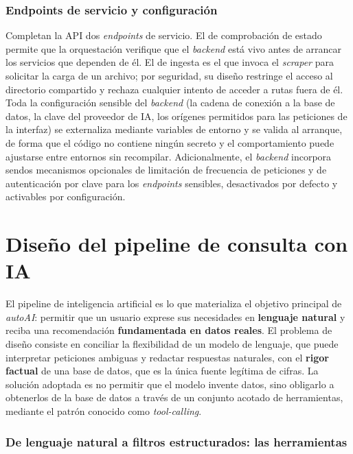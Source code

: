 \subsubsection*{Endpoints de servicio y configuración}

Completan la API dos \emph{endpoints} de servicio. El de comprobación de estado
permite que la orquestación verifique que el \emph{backend} está vivo antes de
arrancar los servicios que dependen de él. El de ingesta es el que invoca el
\emph{scraper} para solicitar la carga de un archivo; por seguridad, su diseño
restringe el acceso al directorio compartido y rechaza cualquier intento de
acceder a rutas fuera de él. Toda la configuración sensible del \emph{backend}
(la cadena de conexión a la base de datos, la clave del proveedor de IA, los
orígenes permitidos para las peticiones de la interfaz) se externaliza mediante
variables de entorno y se valida al arranque, de forma que el código no contiene
ningún secreto y el comportamiento puede ajustarse entre entornos sin
recompilar. Adicionalmente, el \emph{backend} incorpora sendos mecanismos
opcionales de limitación de frecuencia de peticiones y de autenticación por
clave para los \emph{endpoints} sensibles, desactivados por defecto y activables
por configuración.

\section{Diseño del pipeline de consulta con IA}
\label{sec:diseno-pipeline-ia}

El pipeline de inteligencia artificial es lo que materializa el objetivo
principal de \emph{autoAI}: permitir que un usuario exprese sus necesidades en
\textbf{lenguaje natural} y reciba una recomendación \textbf{fundamentada en
datos reales}. El problema de diseño consiste en conciliar la flexibilidad de un
modelo de lenguaje, que puede interpretar peticiones ambiguas y redactar
respuestas naturales, con el \textbf{rigor factual} de una base de datos, que es
la única fuente legítima de cifras. La solución adoptada es no permitir que el
modelo invente datos, sino obligarlo a obtenerlos de la base de datos a través de
un conjunto acotado de herramientas, mediante el patrón conocido como
\emph{tool-calling}.

\subsubsection*{De lenguaje natural a filtros estructurados: las herramientas}

